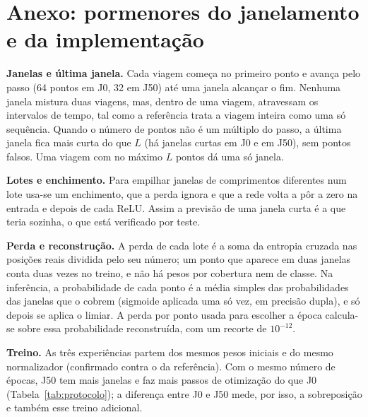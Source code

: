 \documentclass{article}
\newcommand{\revtext}[2]{{\color{#1}#2}}
\begin{document}
\appendix

\section{\texorpdfstring{Anexo: pormenores do janelamento e da implementação}{Anexo: pormenores do janelamento e da implementação}}
\label{sec:anexo}

\revtext{rev052}{\textbf{Janelas e última janela.} Cada viagem começa no primeiro ponto e avança pelo passo (64 pontos em J0, 32 em J50) até uma janela alcançar o fim. Nenhuma janela mistura duas viagens, mas, dentro de uma viagem, atravessam os intervalos de tempo, tal como a referência trata a viagem inteira como uma só sequência. Quando o número de pontos não é um múltiplo do passo, a última janela fica mais curta do que $L$ (há \resJZJanelasCurtas{} janelas curtas em J0 e \resJCJanelasCurtas{} em J50), sem pontos falsos. Uma viagem com no máximo $L$ pontos dá uma só janela.

\textbf{Lotes e enchimento.} Para empilhar janelas de comprimentos diferentes num lote usa-se um enchimento, que a perda ignora e que a rede volta a pôr a zero na entrada e depois de cada ReLU. Assim a previsão de uma janela curta é a que teria sozinha, o que está verificado por teste.

\textbf{Perda e reconstrução.} A perda de cada lote é a soma da entropia cruzada nas posições reais dividida pelo seu número; um ponto que aparece em duas janelas conta duas vezes no treino, e não há pesos por cobertura nem de classe. Na inferência, a probabilidade de cada ponto é a média simples das probabilidades das janelas que o cobrem (sigmoide aplicada uma só vez, em precisão dupla), e só depois se aplica o limiar. A perda por ponto usada para escolher a época calcula-se sobre essa probabilidade reconstruída, com um recorte de $10^{-12}$.

\textbf{Treino.} As três experiências partem dos mesmos pesos iniciais e do mesmo normalizador (confirmado contra o da referência). Com o mesmo número de épocas, J50 tem mais janelas e faz mais passos de otimização do que J0 (Tabela~\ref{tab:protocolo}); a diferença entre J0 e J50 mede, por isso, a sobreposição e também esse treino adicional.}
\end{document}
